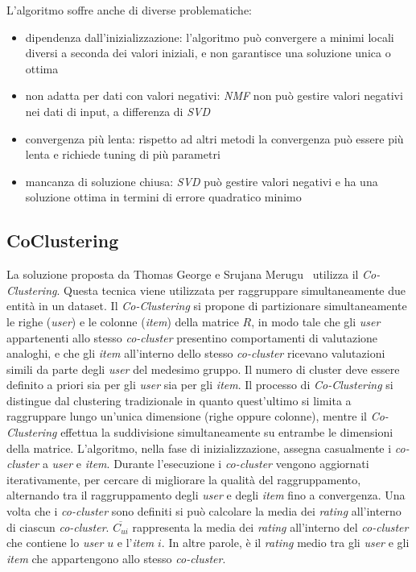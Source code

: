 L'algoritmo soffre anche di diverse problematiche:

\begin{itemize}
    \item dipendenza dall'inizializzazione: l'algoritmo può convergere a minimi locali diversi a seconda dei valori iniziali, e non garantisce una soluzione unica o ottima
    
    \item non adatta per dati con valori negativi: \textit{NMF} non può gestire valori negativi nei dati di input, a differenza di \textit{SVD}
    \item convergenza più lenta: rispetto ad altri metodi la convergenza può essere più lenta e richiede tuning di più parametri
    \item mancanza di soluzione chiusa: \textit{SVD} può gestire valori negativi e ha una soluzione ottima in termini di errore quadratico minimo
\end{itemize}

\subsection{CoClustering}\label{coclustering}

La soluzione proposta da Thomas George e Srujana Merugu~\cite{Co-Clustering} utilizza il \textit{Co-Clustering}. Questa tecnica viene utilizzata per raggruppare simultaneamente due entità in un dataset. Il \textit{Co-Clustering} si propone di partizionare simultaneamente le righe (\textit{user}) e le colonne (\textit{item}) della matrice $R$, in modo tale che gli \textit{user} appartenenti allo stesso \textit{co-cluster} presentino comportamenti di valutazione analoghi, e che gli \textit{item} all'interno dello stesso \textit{co-cluster} ricevano valutazioni simili da parte degli \textit{user} del medesimo gruppo. Il numero di cluster deve essere definito a priori sia per gli \textit{user} sia per gli \textit{item}. Il processo di \textit{Co-Clustering} si distingue dal clustering tradizionale in quanto quest'ultimo si limita a raggruppare lungo un'unica dimensione (righe oppure colonne), mentre il \textit{Co-Clustering} effettua la suddivisione simultaneamente su entrambe le dimensioni della matrice. L'algoritmo, nella fase di inizializzazione, assegna casualmente i \textit{co-cluster} a \textit{user} e \textit{item}. Durante l'esecuzione i \textit{co-cluster} vengono aggiornati iterativamente, per cercare di migliorare la qualità del raggruppamento, alternando tra il raggruppamento degli \textit{user} e degli \textit{item} fino a convergenza. Una volta che i \textit{co-cluster} sono definiti si può calcolare la media dei \textit{rating} all'interno di ciascun \textit{co-cluster}. $ \overline{C_{ui}} $ rappresenta la media dei \textit{rating} all'interno del \textit{co-cluster} che contiene lo \textit{user} $u$ e l'\textit{item} $i$. In altre parole, è il \textit{rating} medio tra gli \textit{user} e gli \textit{item} che appartengono allo stesso \textit{co-cluster}.

